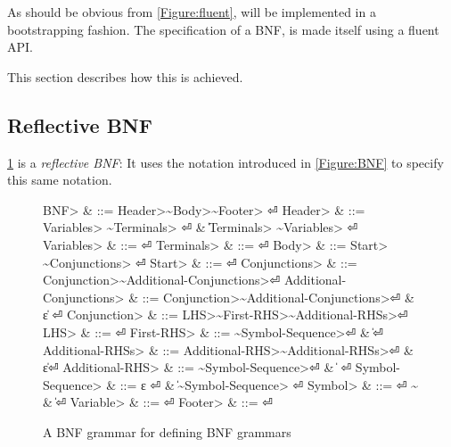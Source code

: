 As should be obvious from \cref{Figure:fluent}, \Self will be implemented
  in a bootstrapping fashion.
The specification of a BNF, is made itself using a fluent API.


This section describes how this is achieved.

\subsection{Reflective BNF}
\cref{Figure:BNF:BNF} is a \emph{reflective BNF}:
It uses the notation introduced in \cref{Figure:BNF}
  to specify this same notation.


\begin{figure}[H]
  \begin{Grammar}
    \begin{aligned}
      \<BNF> & ::= \<Header>\~\<Body>\~\<Footer> \hfill⏎
      \<Header> & ::= \<Variables> \~\<Terminals> \hfill⏎
      {} & \| \<Terminals> \~\<Variables> \hfill⏎
      \<Variables> & ::= \hfill⏎
      \<Terminals> & ::= \hfill⏎
      \<Body> & ::= \<Start> \~\<Conjunctions> \hfill⏎
      \<Start> & ::=  \hfill⏎
      \<Conjunctions> & ::= \<Conjunction>\~\<Additional-Conjunctions>\hfill⏎
      \<Additional-Conjunctions> & ::= \<Conjunction>\~ \<Additional-Conjunctions>\hfill⏎
      {} & \| ε \hfill⏎
      \<Conjunction> & ::= \<LHS>\~\<First-RHS>\~\<Additional-RHSs>\hfill⏎
      \<LHS> & ::= \hfill⏎
      \<First-RHS> & ::=	 \~\<Symbol-Sequence>\hfill⏎
      {} & \| \hfill⏎
      \<Additional-RHSs> & ::= \<Additional-RHS>\~\<Additional-RHSs>\hfill⏎
      {} & \| ε\hfill⏎
      \<Additional-RHS> & ::= \~\<Symbol-Sequence>\hfill⏎
      {} & \|       \hfill⏎
      \<Symbol-Sequence> & ::= ε \hfill⏎
      {} & \| \~\<Symbol-Sequence>      \hfill⏎
      \<Symbol> & ::=  \hfill⏎
      {\~} & \| \hfill⏎
      \<Variable> & ::=  \hfill⏎
      \<Footer> & ::= \hfill⏎
    \end{aligned}
  \end{Grammar}
  \caption{A BNF grammar for defining BNF grammars}
  \label{Figure:BNF:BNF}
\end{figure}
\begin{comment}
Note that this specification can only be approximate;
  the figure uses verbs as replacement to indentation,
  and special symbols such as~$|$,~$::-$ and~$ε$.
\end{comment}

